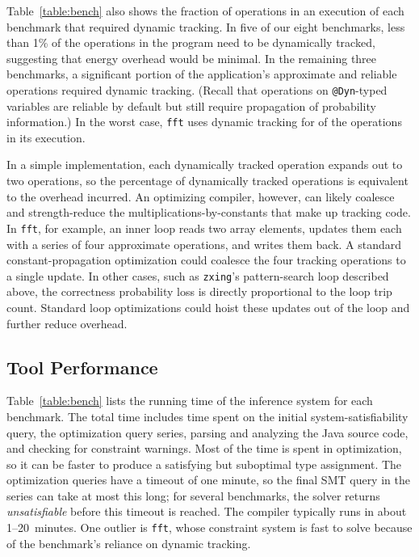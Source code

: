 \documentclass[10pt,nocopyrightspace,preprint]{sigplanconf}
\newcommand{\code}{\lstinline[emphstyle={},keywordstyle={}]}
\begin{document}
Table~\ref{table:bench} also shows the fraction of operations in an execution
of each benchmark that required dynamic tracking.
In five of our eight benchmarks, less than 1\% of the operations in the
program need to be dynamically tracked, suggesting that energy overhead would
be minimal.
In the remaining three benchmarks, a significant portion of the application's
approximate and reliable operations required dynamic tracking.
(Recall that operations on \code{@Dyn}-typed variables are reliable by default
but still require propagation of probability information.)
In the worst case, \code{fft} uses dynamic tracking for  of
the operations in its execution.

In a simple implementation, each dynamically tracked operation expands out to
two operations, so
the percentage of dynamically tracked operations is equivalent to the
overhead incurred.
An optimizing compiler, however, can likely coalesce and strength-reduce the
multiplications-by-constants that make up tracking code.
In \code{fft}, for example, an inner loop reads two array elements, updates
them each with a series of four approximate operations, and writes them back.
A standard constant-propagation optimization could coalesce the four tracking
operations to a single update.
In other cases, such as \code{zxing}'s pattern-search loop described above,
the correctness probability loss is directly proportional to the loop trip
count.
Standard loop optimizations could hoist these updates out of the loop and
further reduce overhead.


\subsection{Tool Performance}

Table~\ref{table:bench} lists the running time of the inference system for
each benchmark.
The total time includes time spent on the initial system-satisfiability query,
the optimization query series, parsing and analyzing the Java
source code, and checking for \lang constraint warnings.
Most of the time is spent in optimization, so it can be faster to produce a
satisfying but suboptimal type assignment.
The optimization queries have a timeout of one minute, so the final SMT query
in the series can take at most this long; for several benchmarks, the solver
returns \emph{unsatisfiable} before this timeout is reached.
The compiler typically runs in about 1--20~minutes.
One outlier is \code{fft}, whose constraint system is fast to solve because of
the benchmark's reliance on dynamic tracking.
\end{document}
